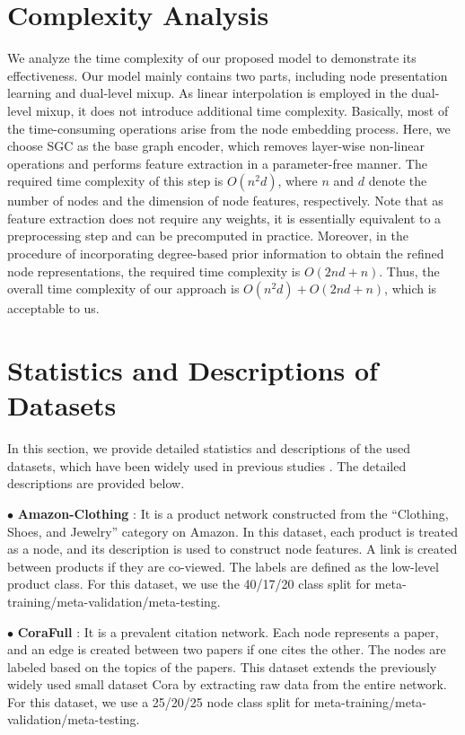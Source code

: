 \section{Complexity Analysis}
\label{complexity}
We analyze the time complexity of our proposed model to demonstrate its effectiveness. Our model mainly contains two parts, including node presentation learning and dual-level mixup. As linear interpolation is employed in the dual-level mixup, it does not introduce additional time complexity. Basically, most of the time-consuming operations arise from the node embedding process. Here, we choose SGC as the base graph encoder, which removes layer-wise non-linear operations and performs feature extraction in a parameter-free manner. The required time complexity of this step is $O(n^2d)$, where $n$ and $d$ denote the number of nodes and the dimension of node features, respectively. Note that as feature extraction does not require any weights, it is essentially equivalent to a preprocessing step and can be precomputed in practice. Moreover, in the procedure of incorporating degree-based prior information to obtain the refined node representations, the required time complexity is $O(2nd+n)$. Thus, the overall time complexity of our approach is $O(n^2d) + O(2nd+n)$, which is acceptable to us.

\section{Statistics and Descriptions of Datasets}
\label{dataset_description}
In this section, we provide detailed statistics and descriptions of the used datasets, which have been widely used in previous studies \cite{ding2020graph, liu2022few, wang2022task}. The detailed descriptions are provided below.

\noindent $\bullet$ \textbf{Amazon-Clothing} \cite{mcauley2015inferring}: It is a product network constructed from the ``Clothing, Shoes, and Jewelry'' category on Amazon. In this dataset, each product is treated as a node, and its description is used to construct node features. A link is created between products if they are co-viewed. The labels are defined as the low-level product class. For this dataset, we use the 40/17/20 class split for meta-training/meta-validation/meta-testing.

\noindent $\bullet$ \textbf{CoraFull} \cite{bojchevski2017deep}: It is a prevalent citation network. Each node represents a paper, and an edge is created between two papers if one cites the other. The nodes are labeled based on the topics of the papers. This dataset extends the previously widely used small dataset Cora by extracting raw data from the entire network. For this dataset, we use a 25/20/25 node class split for meta-training/meta-validation/meta-testing.

